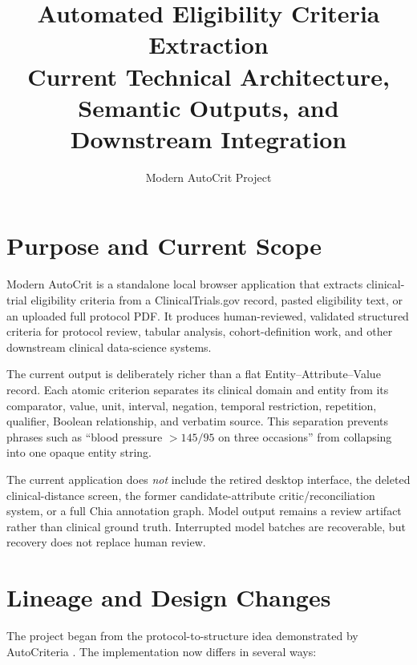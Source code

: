 \documentclass[11pt]{article}
\title{\textcolor{primary}{Automated Eligibility Criteria Extraction}\\
\large Current Technical Architecture, Semantic Outputs, and Downstream Integration}
\author{Modern AutoCrit Project}
\date{}
\begin{document}
\maketitle
\tableofcontents
\newpage

\section{Purpose and Current Scope}

Modern AutoCrit is a standalone local browser application that extracts clinical-trial eligibility criteria from a ClinicalTrials.gov record, pasted eligibility text, or an uploaded full protocol PDF. It produces human-reviewed, validated structured criteria for protocol review, tabular analysis, cohort-definition work, and other downstream clinical data-science systems.

The current output is deliberately richer than a flat Entity--Attribute--Value record. Each atomic criterion separates its clinical domain and entity from its comparator, value, unit, interval, negation, temporal restriction, repetition, qualifier, Boolean relationship, and verbatim source. This separation prevents phrases such as ``blood pressure $>145/95$ on three occasions'' from collapsing into one opaque entity string.

The current application does \emph{not} include the retired desktop interface, the deleted clinical-distance screen, the former candidate-attribute critic/reconciliation system, or a full Chia annotation graph. Model output remains a review artifact rather than clinical ground truth. Interrupted model batches are recoverable, but recovery does not replace human review.

\section{Lineage and Design Changes}

The project began from the protocol-to-structure idea demonstrated by AutoCriteria \cite{autocriteria-repo,autocriteria-paper}. The implementation now differs in several ways:
\end{document}
